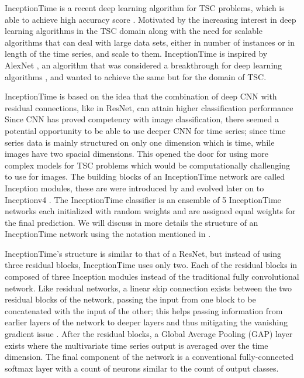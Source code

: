 InceptionTime \cite{fawaz2020inceptiontime} is a recent deep learning algorithm for TSC problems, which is able to achieve high accuracy score \cite{ruiz2020great}.
Motivated by the increasing interest in deep learning algorithms in the TSC domain along with the need for scalable algorithms
that can deal with large data sets, either in number of instances or in length of the time series, and scale to them.
InceptionTime is inspired by AlexNet \cite{krizhevsky2012imagenet}, an algorithm that was considered a breakthrough for deep learning algorithms \cite{alom2018history},
and wanted to achieve the same but for the domain of TSC.

InceptionTime is based on the idea that the combination of deep CNN with residual connections, like in ResNet, can attain higher classification performance \cite{fawaz2019deepreview}
Since CNN has proved competency with image classification, there seemed a potential opportunity to be able to use deeper CNN for time series;
since time series data is mainly structured on only one dimension which is time, while images have two spacial dimensions.
This opened the door for using more complex models for TSC problems which would be computationally challenging to use for images.
The building blocks of an InceptionTime network are called Inception modules, these are were introduced by \cite{szegedy2015going} and evolved later on to Inceptionv4 \cite{szegedy2017inception}.
The InceptionTime classifier is an ensemble of 5 InceptionTime networks each initialized with random weights and are assigned equal weights for the final prediction.
We will discuss in more details the structure of an InceptionTime network using the notation mentioned in \cite{fawaz2020inceptiontime}.

InceptionTime's structure is similar to that of a ResNet, but instead of using three residual blocks, InceptionTime uses only two.
Each of the residual blocks in composed of three Inception modules instead of the traditional fully convolutional network.
Like residual networks, a linear skip connection exists between the two residual blocks of the network, passing the input from one block to be concatenated with the input of the other;
this helps passing information from earlier layers of the network to deeper layers and thus mitigating the vanishing gradient issue \cite{he2016deep}.
After the residual blocks, a Global Average Pooling (GAP) layer exists where the multivariate time series output is averaged over the time dimension.
The final component of the network is a conventional fully-connected softmax layer with a count of neurons similar to the count of output classes.

